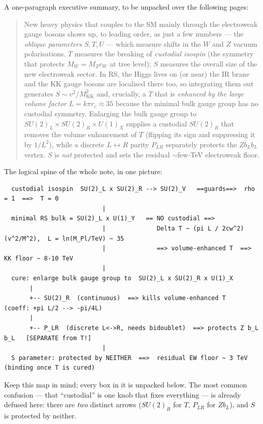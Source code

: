 \documentclass[11pt]{article}
\newcommand{\MKK}{M_{\mathrm{KK}}}
\newcommand{\cw}{c_W}
\newcommand{\vev}{v}
\newcommand{\SUL}{SU(2)_L}
\newcommand{\SUR}{SU(2)_R}
\newcommand{\UX}{U(1)_X}
\newcommand{\PLR}{P_{LR}}
\theoremstyle{definition}
\begin{document}
A one-paragraph executive summary, to be unpacked over the following pages:

\begin{quote}
\small
New heavy physics that couples to the SM mainly through the electroweak gauge
bosons shows up, to leading order, as just a few numbers --- the
\emph{oblique parameters} $S,T,U$ --- which measure shifts in the $W$ and $Z$
vacuum polarisations. $T$ measures the breaking of \emph{custodial
isospin} (the symmetry that protects $M_W = M_Z\cw$ at tree level); $S$
measures the overall size of the new electroweak sector. In RS, the Higgs lives
on (or near) the IR brane and the KK gauge bosons are localised there too, so
integrating them out generates $S\sim \vev^2/\MKK^2$ and, crucially, a $T$ that
is \emph{enhanced by the large volume factor} $L=k\pi r_c \approx 35$ because the
minimal bulk gauge group has no custodial symmetry. Enlarging the bulk gauge
group to $\SUL\times\SUR\times\UX$ supplies a custodial $\SUR$ that removes the
volume enhancement of $T$ (flipping its sign and suppressing it by $1/L^2$),
while a discrete $L\!\leftrightarrow\! R$ parity $\PLR$ separately protects the
$Z\bar b_L b_L$ vertex. $S$ is \emph{not} protected and sets the residual
$\sim$few-TeV electroweak floor.
\end{quote}

\noindent The logical spine of the whole note, in one picture:
\begin{footnotesize}
\begin{verbatim}
  custodial isospin  SU(2)_L x SU(2)_R --> SU(2)_V   ==guards==>  rho = 1  ==>  T = 0
                           |
  minimal RS bulk = SU(2)_L x U(1)_Y   == NO custodial ==>
                           |              Delta T ~ (pi L / 2cw^2)(v^2/M^2),  L = ln(M_Pl/TeV) ~ 35
                           |              ==> volume-enhanced T  ==> KK floor ~ 8-10 TeV
                           |
  cure: enlarge bulk gauge group to  SU(2)_L x SU(2)_R x U(1)_X
       |
       +-- SU(2)_R  (continuous)  ==> kills volume-enhanced T   (coeff: +pi L/2 --> -pi/4L)
       |
       +-- P_LR  (discrete L<->R, needs bidoublet)  ==> protects Z b_L b_L   [SEPARATE from T!]
                           |
  S parameter: protected by NEITHER  ==>  residual EW floor ~ 3 TeV  (binding once T is cured)
\end{verbatim}
\end{footnotesize}
\noindent Keep this map in mind; every box in it is unpacked below. The most
common confusion --- that ``custodial'' is one knob that fixes everything --- is
already defused here: there are \emph{two} distinct arrows ($\SUR$ for $T$,
$\PLR$ for $Zb_L$), and $S$ is protected by neither.
\end{document}
